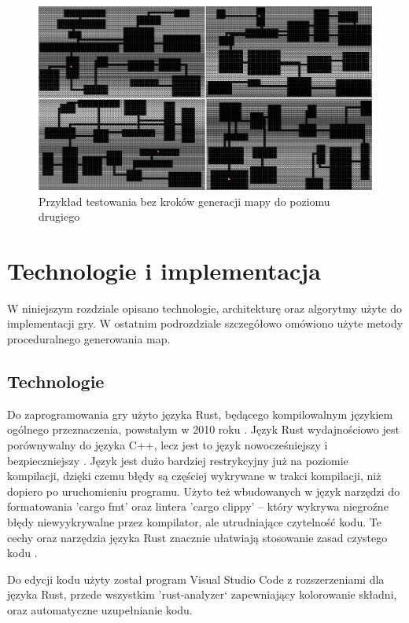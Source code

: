 \documentclass[12pt,twoside]{article}
\begin{document}
\FloatBarrier
\begin{figure}[h]
	\centering
	\includegraphics[width=16cm]{images/mygame/tester_nosteps.png}
	\caption{Przykład testowania bez kroków generacji mapy do poziomu drugiego}
	\label{mygame:tester_nosteps}
\end{figure}
\FloatBarrier

\clearpage	



\section{Technologie i implementacja}
W niniejszym rozdziale opisano technologie, architekturę oraz algorytmy użyte do implementacji gry. W ostatnim podrozdziale szczegółowo omówiono użyte metody proceduralnego generowania map.


\subsection{Technologie}
Do zaprogramowania gry użyto języka Rust, będącego kompilowalnym językiem ogólnego przeznaczenia, powstałym w 2010 roku \cite{book_rust}. Język Rust wydajnościowo jest porównywalny do języka C++, lecz jest to język nowocześniejszy i bezpieczniejszy \cite{rust_vs_cpp}. Język jest dużo bardziej restrykcyjny już na poziomie kompilacji, dzięki czemu błędy są częściej wykrywane w trakci kompilacji, niż dopiero po uruchomieniu programu. Użyto też wbudowanych w język narzędzi do formatowania 'cargo fmt' oraz lintera 'cargo clippy' -- który wykrywa niegroźne błędy niewyykrywalne przez kompilator, ale utrudniające czytelność kodu. Te cechy oraz narzędzia języka Rust znacznie ułatwiają stosowanie zasad czystego kodu \cite{book_czystykod}.

Do edycji kodu użyty został program Visual Studio Code \cite{vs_code} z rozszerzeniami dla języka Rust, przede wszystkim 'rust-analyzer` zapewniający kolorowanie składni, oraz automatyczne uzupełnianie kodu.
\end{document}
